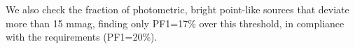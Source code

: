 \documentclass[\docopts]{\docclass}
\begin{document}



We also check the fraction of photometric, bright point-like sources that deviate more than 15 mmag, finding only PF1=17\% over this threshold, in compliance with the requirements (PF1=20\%).
\end{document}

